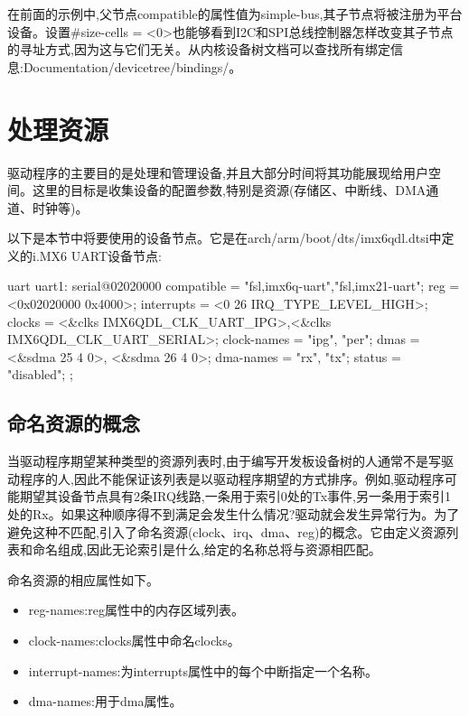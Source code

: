\documentclass[lang=cn,newtx,10pt,scheme=chinese]{elegantbook}
\begin{document}
在前面的示例中,父节点compatible的属性值为simple-bus,其子节点将被注册为平台设备。设置\#size-cells = <0>也能够看到I2C和SPI总线控制器怎样改变其子节点的寻址方式,因为这与它们无关。从内核设备树文档可以查找所有绑定信息:Documentation/devicetree/bindings/。

\section{处理资源}

驱动程序的主要目的是处理和管理设备,并且大部分时间将其功能展现给用户空间。这里的目标是收集设备的配置参数,特别是资源(存储区、中断线、DMA通道、时钟等)。

以下是本节中将要使用的设备节点。它是在arch/arm/boot/dts/imx6qdl.dtsi中定义的i.MX6 UART设备节点:

\begin{mycode}{uart}
uart1: serial@02020000 {
    compatible = "fsl,imx6q-uart","fsl,imx21-uart";
    reg = <0x02020000 0x4000>;
    interrupts = <0 26 IRQ_TYPE_LEVEL_HIGH>;
    clocks = <&clks IMX6QDL_CLK_UART_IPG>,<&clks IMX6QDL_CLK_UART_SERIAL>;
    clock-names = "ipg", "per";
    dmas = <&sdma 25 4 0>, <&sdma 26 4 0>;
    dma-names = "rx", "tx";
    status = "disabled";
};
\end{mycode}

\subsection{命名资源的概念}

当驱动程序期望某种类型的资源列表时,由于编写开发板设备树的人通常不是写驱动程序的人,因此不能保证该列表是以驱动程序期望的方式排序。例如,驱动程序可能期望其设备节点具有2条IRQ线路,一条用于索引0处的Tx事件,另一条用于索引1处的Rx。如果这种顺序得不到满足会发生什么情况?驱动就会发生异常行为。为了避免这种不匹配,引入了命名资源(clock、irq、dma、reg)的概念。它由定义资源列表和命名组成,因此无论索引是什么,给定的名称总将与资源相匹配。

命名资源的相应属性如下。

\begin{itemize}
    \item reg-names:reg属性中的内存区域列表。
    \item clock-names:clocks属性中命名clocks。
    \item interrupt-names:为interrupts属性中的每个中断指定一个名称。
    \item dma-names:用于dma属性。
\end{itemize}
\end{document}
